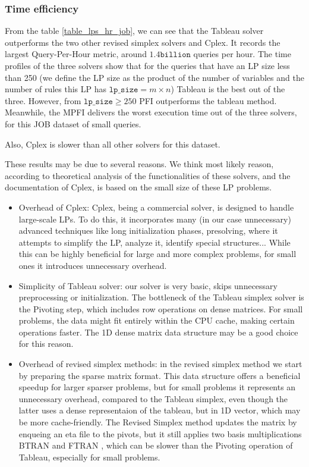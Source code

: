 \subsubsection{Time efficiency}
From the table \ref{table_lps_hr_job}, we can see that the Tableau solver
outperforms the two other revised simplex solvers and Cplex. It records
the largest Query-Per-Hour metric, around $ 1.4 \texttt{billion}$ queries per hour.
The time profiles of the three solvers show that for the queries that have
an LP size less than 250 (we define the LP size as the product of the number 
of variables and the number of rules this LP has $\texttt{lp\_size} = m \times n$)
Tableau is the best out of the three. 
However, from $\texttt{lp\_size} \geq 250$ PFI outperforms the tableau method.
Meanwhile, the MPFI delivers the worst execution time out of the three solvers, for
this JOB dataset of small queries. 

Also, Cplex is slower than all other solvers for this dataset.

These results may be due to several reasons. We think most likely reason,
according to theoretical analysis of the functionalities of these solvers, and the documentation
of Cplex, is based on the small size of these LP problems.

\begin{itemize}
    \item Overhead of Cplex: Cplex, being a commercial solver, is designed to handle
    large-scale LPs. To do this, it incorporates many (in our case unnecessary) advanced techniques like 
    long initialization phases, presolving,
    where it attempts to simplify the LP, analyze it, identify special structures... While
    this can be highly beneficial for large and more complex problems, for small ones it 
    introduces unnecessary overhead.
    \item Simplicity of Tableau solver: our solver is very basic, skips unnecessary
    preprocessing or initialization. The bottleneck of the Tableau simplex solver
    is the Pivoting step, which includes row operations on dense matrices.
    For small problems, the data might fit entirely within the CPU cache, 
    making certain operations faster. The 1D dense matrix data structure may be a good 
    choice for this reason.
    \item Overhead of revised simplex methods: in the revised simplex method we start by
    preparing the sparse matrix format. This data structure offers a beneficial speedup 
    for larger sparser problems, but for small problems it represents an unnecessary 
    overhead, compared to the Tableau simplex, even though the latter uses a dense 
    representaion of the tableau, but in 1D vector, which may be more cache-friendly.
    The Revised Simplex method updates the matrix by enqueing an eta file to the pivots,
    but it still applies two basis multiplications BTRAN and FTRAN
    , which can be slower than the Pivoting operation of Tableau, especially for
     small problems.

\end{itemize}


